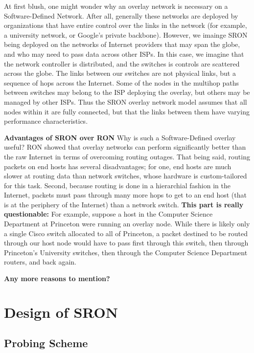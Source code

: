 \documentclass[pageno]{jpaper}
\begin{document}
At first blush, one might 
wonder why an overlay network is necessary on a Software-Defined Network. After all, generally
these networks are deployed by organizations that have entire control over the links in the 
network (for example, a university network, or Google's private backbone). However, we imainge
SRON being deployed on the networks of Internet providers that may span the globe, and who may
need to pass data across other ISPs. In this case, we imagine that the network controller is 
distributed, and the switches is controls are scattered across the globe. The links between 
our switches are not physical links, but a sequence of hops across the Internet. Some of the 
nodes in the multihop paths between switches may belong to the ISP deploying the overlay, 
but others may be managed by other ISPs.  Thus the SRON overlay network model assumes that all
nodes within it are fully connected, but that the links between them have varying performance 
characteristics.\bigskip

{\bf Advantages of SRON over RON}
Why is such a Software-Defined overlay useful? RON\cite{ron} showed that overlay networks can 
perform significantly better than the raw Internet in terms of overcoming routing outages. That 
being said, routing packets on end hosts has several disadvantages; for one, end hosts are 
much slower at routing data than network switches, whose hardware is custom-tailored for this task.
Second, because routing is done in a hierarchial fashion in the Internet, packets must pass 
through many more hops to get to an end host (that is at the periphery of the Internet) than a 
network switch.
{\bf This part is really questionable:} 
For example, suppose a host in the Computer Science Department at Princeton 
were running an overlay node. While there is likely only a single Cisco switch allocated to all of 
Princeton, a packet destined to be routed through our host node would have to pass first through this 
switch, then through Princeton's University switches, then through the Computer Science Department
routers, and back again.

{\bf Any more reasons to mention?} 

\section{Design of SRON}

\subsection{Probing Scheme}
\end{document}
